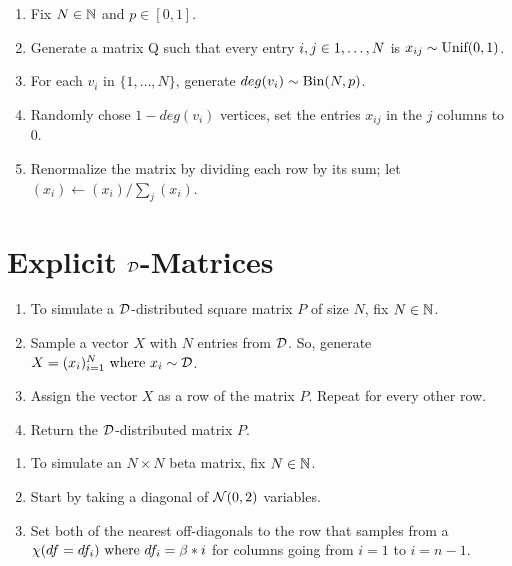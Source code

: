 \begin{algorithm} \hfill
\begin{enumerate}
	\item{Fix $N \in \N$ and $p \in [0,1]$}.
	\item{Generate a matrix Q such that every entry $i,j\in \oneto[N]$ is $x_{ij} \sim \Unif(0,1)$.}
	\item{For each $v_i$ in $\{1,\dots,N\}$, generate $deg(v_i) \sim \Bin(N,p)$.}
	\item{Randomly chose $1-deg(v_i)$ vertices, set the entries $x_{ij}$ in the $j$ columns to 0.}
	\item{Renormalize the matrix by dividing each row by its sum; let $(x_i) \leftarrow (x_i)/\sum_j(x_i)$}.
\end{enumerate}
\end{algorithm}


\section{Explicit $\D$-Matrices}

\begin{algorithm} \hfill
\begin{enumerate}
	\item To simulate a $\D$-distributed square matrix $P$ of size $N$, fix $N \in \N$.
	\item Sample a vector $X$ with $N$ entries from $\D$. So, generate $X = (x_i)_{i = 1}^N \where x_i \sim \D$.
	\item Assign the vector $X$ as a row of the matrix $P$. Repeat for every other row.
	\item Return the $\D$-distributed matrix $P$.
\end{enumerate}
\end{algorithm}

\begin{algorithm} \hfill
  \begin{enumerate}
    \item To simulate an $N \times N$ beta matrix, fix $N \in \N$.
    \item Start by taking a diagonal of $\Normal(0,2)$ variables.
    \item Set both of the nearest off-diagonals to the row that samples from a $\chi(df = df_i) \where df_i = \beta * i$ for columns going from $i = 1$ to $i = n-1$.
  \end{enumerate}
\end{algorithm}

